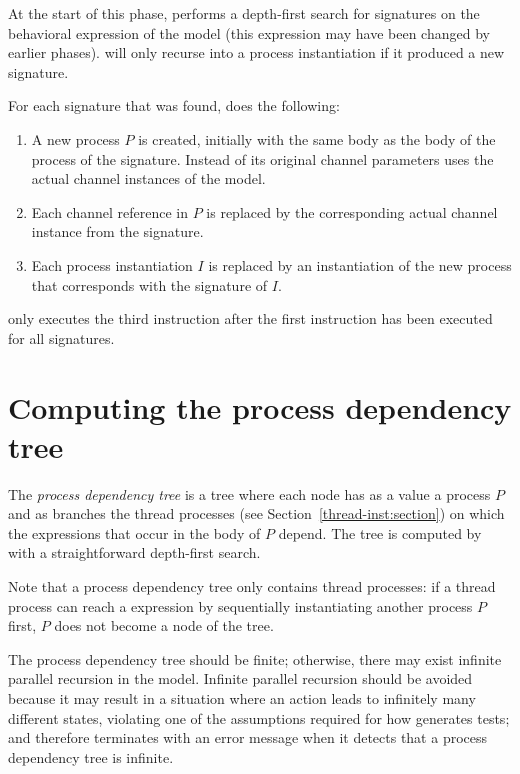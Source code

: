At the start of this phase, \lpeq{} performs a depth-first search for signatures on the behavioral expression of the model (this expression may have been changed by earlier phases).
\lpeq{} will only recurse into a process instantiation if it produced a new signature.

For each signature that was found, \lpeq{} does the following:
\begin{enumerate}[1.]
\item A new process $P$ is created, initially with the same body as the body of the process of the signature.
Instead of its original channel parameters \lpeq{} uses the actual channel instances of the model.
\item Each channel reference in $P$ is replaced by the corresponding actual channel instance from the signature.
\item Each process instantiation $I$ is replaced by an instantiation of the new process that corresponds with the signature of $I$.
\end{enumerate}

\lpeq{} only executes the third instruction after the first instruction has been executed for all signatures.

\section{Computing the process dependency tree} \label{procdeptree:section}

The \emph{process dependency tree} is a tree where each node has as a value a process $P$ and as branches the thread processes (see Section~\ref{thread-inst:section}) on which the \pedi{} expressions that occur in the body of $P$ depend.
The tree is computed by \lpeq{} with a straightforward depth-first search.

Note that a process dependency tree only contains thread processes: if a thread process can reach a \pedi{} expression by sequentially instantiating another process $P$ first, $P$ does not become a node of the tree.

The process dependency tree should be finite; otherwise, there may exist infinite parallel recursion in the model.
Infinite parallel recursion should be avoided because it may result in a situation where an action leads to infinitely many different states, violating one of the assumptions required for how \txs{} generates tests; and therefore \lpeq{} terminates with an error message when it detects that a process dependency tree is infinite.

